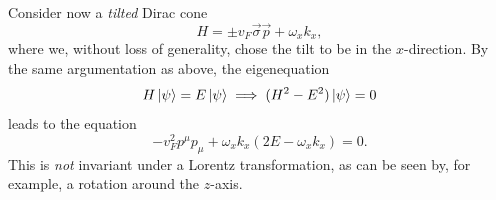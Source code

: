 Consider now a \emph{tilted} Dirac cone
\begin{equation}
  \label{eq:115}
  H = \pm v_F \vec{\sigma} \vec{p} + \omega_x k_x,
\end{equation}
where we, without loss of generality, chose the tilt to be in the \( x \)-direction.
By the same argumentation as above, the eigenequation
\[
  H \ket{\psi} = E\ket{\psi} \implies (H^2 - E^2)\ket{\psi} = 0
\]
leads to the equation
\begin{equation}
  \label{eq:116}
  -v_F^2 p^{\mu} p_{\mu} + \omega_{x} k_x (2 E - \omega_x k_x) = 0.
\end{equation}
This is \emph{not} invariant under a Lorentz transformation, as can be seen by, for example, a rotation around the \( z \)-axis.



